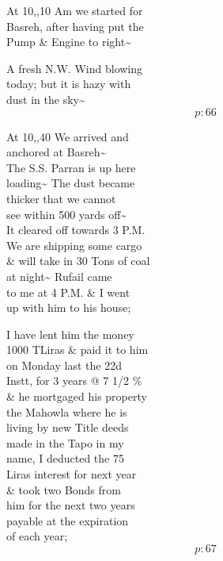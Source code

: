 \documentclass{report}
\begin{document}
	\par{
 	At 10,,10 Am we started for\ \\Basreh, after having put the\ \\Pump \& Engine to right\~{}\ \\
	}

	\par{
 	A fresh N.W. Wind blowing\ \\today; but it is hazy with\ \\dust in the sky\~{}\ \\
  \[p: 66 \]

	}


	\par{
 	At 10,,40 We arrived and\ \\anchored at Basreh\~{}\ \\The S.S. Parran is up here\ \\loading\~{} The dust became\ \\thicker that we cannot\ \\see within 500 yards off\~{}\ \\It cleared off towards 3 P.M.\ \\We are shipping some cargo\ \\\& will take in 30 Tons of coal\ \\at night\~{} Rufail came\ \\to me at 4 P.M. \& I went\ \\up with him to his house;\ \\
	}

	\par{
 	I have lent him the money\ \\1000 TLiras \& paid it to him\ \\on Monday last the 22d\ \\Instt, for 3 years @ 7 1/2 \%\ \\\& he mortgaged his property\ \\the Mahowla where he is\ \\living by new Title deeds\ \\made in the Tapo in my\ \\name, I deducted the 75\ \\Liras interest for next year\ \\\& took two Bonds from\ \\him for the next two years\ \\payable at the expiration\ \\of each year;\ \\
  \[p: 67 \]

	}
\end{document}

